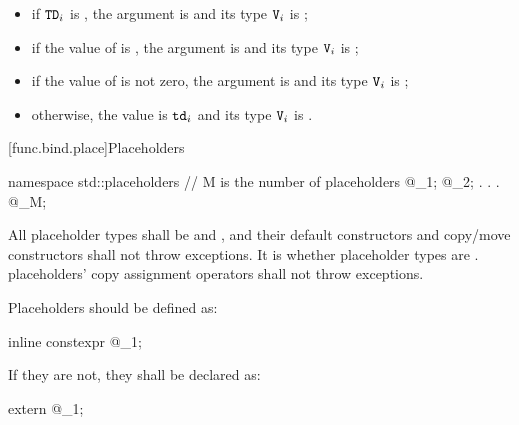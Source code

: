 \begin{itemize}
\item if $\texttt{TD}_i$ is , the
argument is  and its type $\texttt{V}_i$ is ;

\item if the value of 
is , the argument is   and its
type $\texttt{V}_i$ is
;

\item if the value  of 
is not zero, the  argument is 
and its type $\texttt{V}_i$
is ;

\item otherwise, the value is $\texttt{td}_i$ and its type $\texttt{V}_i$
is .
\end{itemize}
%

[func.bind.place]{Placeholders}

%
%
\begin{codeblock}
namespace std::placeholders {
  // M is the  number of placeholders
  @\seebelow@ _1;
  @\seebelow@ _2;
              .
              .
              .
  @\seebelow@ _M;
}
\end{codeblock}

\pnum
All placeholder types shall be  and
, and their default constructors and copy/move
constructors shall not throw exceptions. It is  whether
placeholder types are .  placeholders' copy
assignment operators shall not throw exceptions.

\pnum
Placeholders should be defined as:
\begin{codeblock}
inline constexpr @\unspec@ _1{};
\end{codeblock}
If they are not, they shall be declared as:
\begin{codeblock}
extern @\unspec@ _1;
\end{codeblock}%

